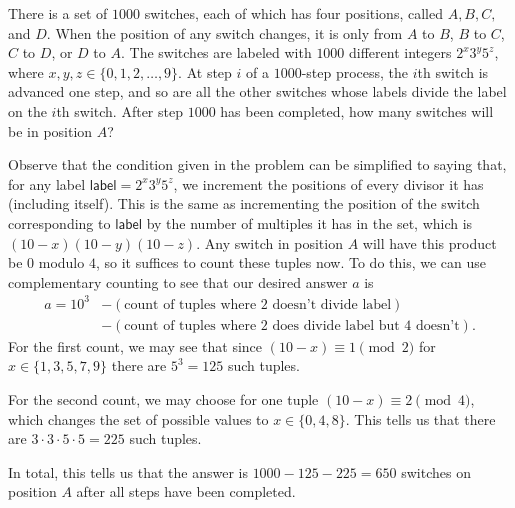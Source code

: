\documentclass[a4paper, 12pt]{article}
\begin{document}
\setcounter{pnum}{6}

\begin{chirpbox}
    \begin{problemnum}
        There is a set of \( 1000 \) switches, each of which has four positions, called \( A, B, C, \) and \( D \). When the position of any switch changes, it is only from \( A \) to \( B \), \( B \) to \( C \), \( C \) to \( D \), or \( D \) to \( A \). The switches are labeled with \( 1000 \) different integers \( 2^x 3^y 5^z \), where \( x, y, z \in \{0, 1, 2, \ldots, 9 \} \). At step \( i \) of a \( 1000 \)-step process, the \( i \)th switch is advanced one step, and so are all the other switches whose labels divide the label on the \( i \)th switch. After step \( 1000 \) has been completed, how many switches will be in position \( A \)?
    \end{problemnum}
\end{chirpbox}

\begin{solution}
    Observe that the condition given in the problem can be simplified to saying that, for any label \( \textsf{label} = 2^x 3^y 5^z \), we increment the positions of every divisor it has (including itself). This is the same as incrementing the position of the switch corresponding to \( \textsf{label} \) by the number of multiples it has in the set, which is \( (10-x)(10-y)(10-z) \). Any switch in position \( A \) will have this product be \( 0 \) modulo \( 4 \), so it suffices to count these tuples now. To do this, we can use complementary counting to see that our desired answer \( a \) is
    \begin{align*}
        a = 10^3 &- (\textrm{count of tuples where 2 doesn't divide label}) \\ 
        &- (\textrm{count of tuples where 2 does divide label but 4 doesn't})
    .\end{align*}
    For the first count, we may see that since \( (10-x) \equiv 1 \pmod{2} \) for \( x \in \{1, 3, 5, 7, 9\} \) there are \( 5^3 = 125 \) such tuples.

    For the second count, we may choose for one tuple \( (10 - x) \equiv 2 \pmod{4} \), which changes the set of possible values to \( x \in \{0, 4, 8\} \). This tells us that there are \( 3 \cdot 3 \cdot 5 \cdot 5 = 225 \) such tuples.

    In total, this tells us that the answer is \( 1000 - 125 - 225 = \boxed{650} \) switches on position \( A \) after all steps have been completed.
\end{solution}
\end{document}
